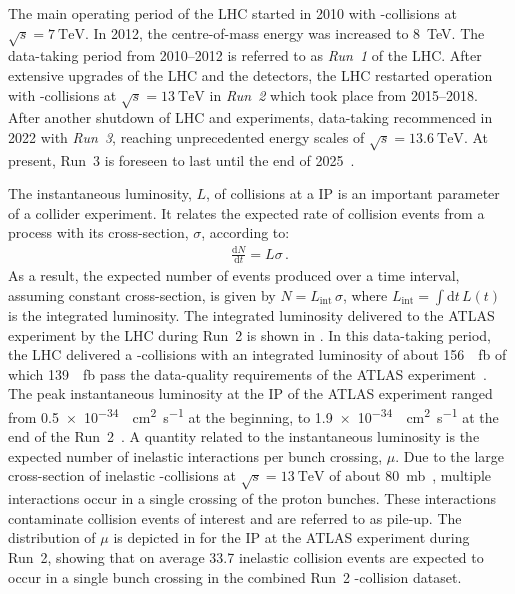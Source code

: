 The main operating period of the LHC started in 2010 with \pp-collisions at
$\sqrt{s} = \SI{7}{\TeV}$. In 2012, the centre-of-mass energy was increased to
\SI{8}{\TeV}. The data-taking period from 2010--2012 is referred to as
\emph{Run~1} of the LHC. After extensive upgrades of the LHC and the detectors,
the LHC restarted operation with \pp-collisions at $\sqrt{s} = \SI{13}{\TeV}$ in
\emph{Run~2} which took place from 2015--2018. After another shutdown of LHC and
experiments, data-taking recommenced in 2022 with \emph{Run~3}, reaching
unprecedented energy scales of $\sqrt{s} = \SI{13.6}{\TeV}$. At present, Run~3
is foreseen to last until the end of 2025~\cite{lhc_schedule}.

The instantaneous luminosity, $L$, of collisions at a IP is an important
parameter of a collider experiment. It relates the expected rate of collision
events from a process with its cross-section, $\sigma$, according to:
\begin{align*}
  \frac{\mathrm{d}N}{\mathrm{d}t} = L \sigma \,\text{.}
\end{align*}
As a result, the expected number of events produced over a time interval,
assuming constant cross-section, is given by $N = L_{\text{int}} \, \sigma$,
where $L_{\text{int}} = \int \mathrm{d}t \, L(t)$ is the integrated
luminosity. The integrated luminosity delivered to the ATLAS experiment by the
LHC during Run~2 is shown in . In this
data-taking period, the LHC delivered a \pp-collisions with an integrated
luminosity of about \SI{156}{\per\femto\barn} of which \SI{139}{\per\femto\barn}
pass the data-quality requirements of the ATLAS
experiment~\cite{ATLAS-CONF-2019-021}.  The peak instantaneous luminosity at the
IP of the ATLAS experiment ranged from
\SI{0.5e-34}{\per\centi\metre\squared\per\second} at the beginning, to
\SI{1.9e-34}{\per\centi\metre\squared\per\second} at the end of the
Run~2~\cite{ATLAS-CONF-2019-021}. A quantity related to the instantaneous
luminosity is the expected number of inelastic \pp interactions per bunch
crossing, $\mu$. Due to the large cross-section of inelastic \pp-collisions at
$\sqrt{s} = \SI{13}{\TeV}$ of about \SI{80}{\milli\barn}~\cite{STDM-2015-05},
multiple interactions occur in a single crossing of the proton bunches. These
interactions contaminate collision events of interest and are referred to as
pile-up. The distribution of $\mu$ is depicted in  for the IP
at the ATLAS experiment during Run~2, showing that on average \num{33.7}
inelastic collision events are expected to occur in a single bunch crossing in
the combined Run~2 \pp-collision dataset.

